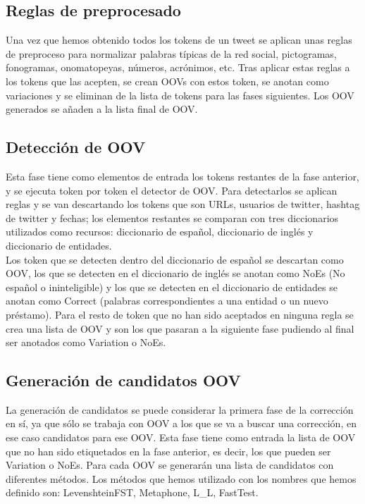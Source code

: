 \documentclass[spanish,12pt, a4paper,twoside]{paper}
\begin{document}
\subsection{Reglas de preprocesado}\label{sec:reglasdepreprocesado}
Una vez que hemos obtenido todos los tokens de un tweet se aplican unas reglas de preproceso para normalizar palabras típicas de la red social, pictogramas, fonogramas, onomatopeyas, números, acrónimos, etc. Tras aplicar estas reglas a los tokens que las acepten, se crean OOVs con estos token, se anotan como variaciones y se eliminan de la lista de tokens para las fases siguientes. Los OOV generados se añaden a la lista final de OOV.

\subsection{Detección de OOV}\label{sec:detecciondeoov}
Esta fase tiene como elementos de entrada los tokens restantes de la fase anterior, y se ejecuta token por token el detector de OOV. Para detectarlos se aplican reglas y se van descartando los tokens que son URLs, usuarios de twitter, hashtag de twitter y fechas; los elementos restantes se comparan con tres diccionarios utilizados como recursos: diccionario de español, diccionario de inglés y diccionario de entidades.\\

Los token que se detecten dentro del diccionario de español se descartan como OOV, los que se detecten en el diccionario de inglés se anotan como NoEs (No español o ininteligible) y los que se detecten en el diccionario de entidades se anotan como Correct (palabras correspondientes a una entidad o un nuevo préstamo). Para el resto de token que no han sido aceptados en ninguna regla se crea una lista de OOV y son los que pasaran a la siguiente fase pudiendo al final ser anotados como Variation o NoEs.

\subsection{Generación de candidatos OOV}\label{sec:generaciondecandidatosoov}
La generación de candidatos se puede considerar la primera fase de la corrección en sí, ya que sólo se trabaja con OOV a los que se va a buscar una corrección, en ese caso candidatos para ese OOV.
Esta fase tiene como entrada la lista de OOV que no han sido etiquetados en la fase anterior, es decir, los que pueden ser Variation o NoEs. Para cada OOV se generarán una lista de candidatos con diferentes métodos. Los métodos que hemos utilizado con los nombres que hemos definido son: LevenshteinFST, Metaphone, L\_L, FastTest.
\end{document}
